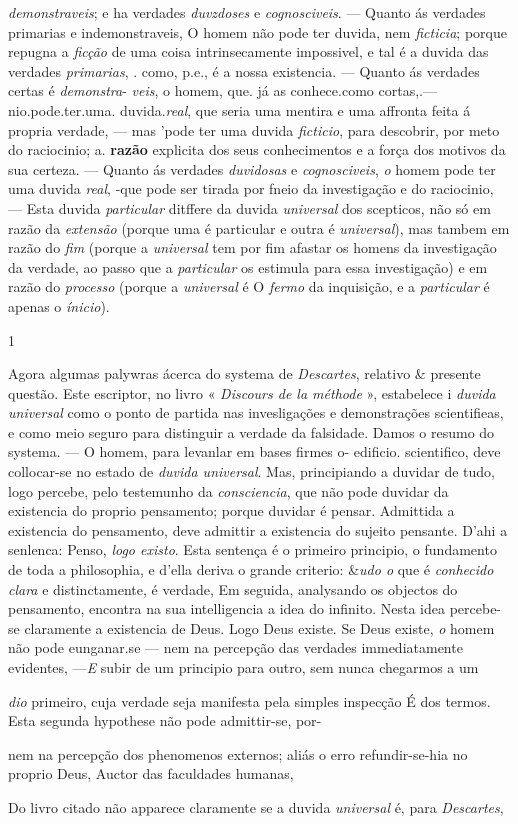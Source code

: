 \emph{demonstraveis}; e ha verdades \emph{duvzdoses} e \emph{cognosciveis}. --- Quanto ás verdades primarias e indemonstraveis, O homem não pode ter duvida, nem \emph{ficticia}; porque repugna a \emph{ficção} de uma coisa intrinsecamente impossivel, e tal é a duvida das verdades \emph{primarias}, . como, p.e., é a nossa existencia. --- Quanto ás verdades certas é \emph{demonstra}- \emph{veis}, o homem, que. já as conhece.como cortas,.--- nio.pode.ter.uma. duvida.\emph{real}, que seria uma mentira e uma affronta feita á propria verdade, --- mas 'pode ter uma duvida \emph{ficticio}, para descobrir, por meto do raciocinio; a. \textbf{razão} explicita dos seus conhecimentos e a força dos motivos da sua certeza. --- Quanto ás verdades \emph{duvidosas} e \emph{cognosciveis}, \emph{o} homem pode ter uma duvida \emph{real}, -que pode ser tirada por fneio da investigação e do raciocinio, --- Esta duvida \emph{particular} ditffere da duvida \emph{universal} dos scepticos, não só em razão da \emph{extensão} (porque uma é particular e outra é \emph{universal}), mas tambem em razão do \emph{fim} (porque a \emph{universal} tem por fim afastar os homens da investigação da verdade, ao passo que a \emph{particular} os estimula para essa investigação) e em razão do \emph{processo} (porque a \emph{universal} é O \emph{fermo} da inquisição, e a \emph{particular} é apenas o \emph{ínicio}).\par * 1\par Agora algumas palywras ácerca do systema de \emph{Descartes}, relativo \& presente questão. Este escriptor, no livro « \emph{Discours de la méthode} », estabelece i \emph{duvida universal} como o ponto de partida nas invesligações e demonstrações scientifieas, e como meio seguro para distinguir a verdade da falsidade. Damos o resumo do systema. --- O homem, para levanlar em bases firmes o- edificio. scientifico, deve collocar-se no estado de \emph{duvida universal}. Mas, principiando a duvidar de tudo, logo percebe, pelo testemunho da \emph{consciencia}, que não pode duvidar da existencia do proprio pensamento; porque duvidar é pensar. Admittida a existencia do pensamento, deve admittir a existencia do sujeito pensante. D'ahi a senlenca: Penso, \emph{logo existo}. Esta sentença é o primeiro principio, o fundamento de toda a philosophia, e d'ella deriva o grande criterio: \&\emph{udo o} que é \emph{conhecido clara} e distinctamente, é verdade, Em seguida, analysando os objectos do pensamento, encontra na sua intelligencia a idea do infinito. Nesta idea percebe-se claramente a existencia de Deus. Logo Deus existe. Se Deus existe, \emph{o} homem não pode eunganar.se --- nem na percepção das verdades immediatamente evidentes, ---\emph{E} subir de um principio para outro, sem nunca chegarmos a um\par \emph{dio} primeiro, cuja verdade seja manifesta pela simples inspecção É dos termos. Esta segunda hypothese não pode admittir-se, por-\par nem na percepção dos phenomenos externos; aliás o erro refundir-se-hia no proprio Deus, Auctor das faculdades humanas,\par Do livro citado não apparece claramente se a duvida \emph{universal} é, para \emph{Descartes}, 